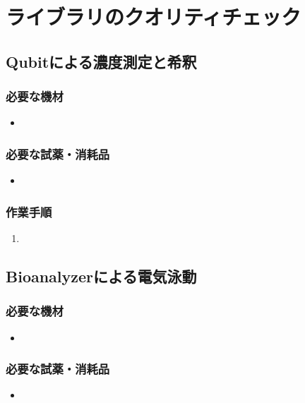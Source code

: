 \documentclass[titlepage,10pt,a4paper]{jsbook}
\begin{document}
\section{ライブラリのクオリティチェック}

\subsection{Qubitによる濃度測定と希釈}

\subsubsection{必要な機材}
\begin{itemize}
\item 
\end{itemize}

\subsubsection{必要な試薬・消耗品}
\begin{itemize}
\item 
\end{itemize}

\subsubsection{作業手順}
\begin{enumerate}
\item 
\end{enumerate}

\subsection{Bioanalyzerによる電気泳動}

\subsubsection{必要な機材}
\begin{itemize}
\item 
\end{itemize}

\subsubsection{必要な試薬・消耗品}
\begin{itemize}
\item 
\end{itemize}
\end{document}
